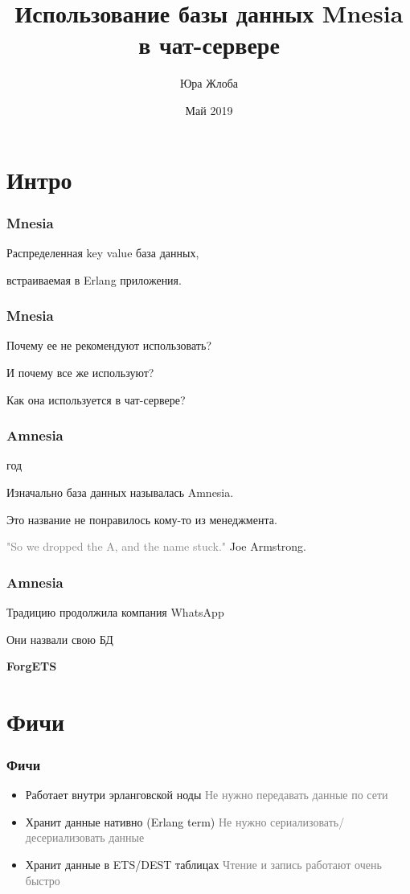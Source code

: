 \documentclass[10pt]{beamer}
\title{Использование базы данных Mnesia в чат-сервере}
\author{Юра Жлоба}
\institute{Wargaming.net}
\date{Май 2019}
\begin{document}
\maketitle

\section{Интро}

\begin{frame}
\frametitle{Mnesia}
\centering
Распределенная key value база данных,
\par \bigskip
встраиваемая в Erlang приложения.
\end{frame}

\begin{frame}
\frametitle{Mnesia}
\centering
Почему ее не рекомендуют использовать?
\par \bigskip
И почему все же используют?
\par \bigskip
Как она используется в чат-сервере?
\end{frame}

\begin{frame}
\frametitle{Amnesia}
 год
\par \bigskip
Изначально база данных называлась Amnesia.
\par \bigskip
Это название не понравилось кому-то из менеджмента.
\par \bigskip
\textcolor{gray}{"So we dropped the A, and the name stuck."} Joe Armstrong.
\end{frame}

\begin{frame}
\frametitle{Amnesia}
\centering
Традицию продолжила компания WhatsApp
\par \bigskip
Они назвали свою БД
\par \bigskip
\textbf{ForgETS}
\end{frame}

\section{Фичи}

\begin{frame}
\frametitle{Фичи}
\begin{itemize}[<+->]
\item Работает внутри эрланговской ноды\newline
  \textcolor{gray}{Не нужно передавать данные по сети}
\item Хранит данные нативно (Erlang term)\newline
  \textcolor{gray}{Не нужно сериализовать/десериализовать данные}
\item Хранит данные в ETS/DEST таблицах\newline
  \textcolor{gray}{Чтение и запись работают очень быстро}
\end{itemize}
\end{frame}
\end{document}

